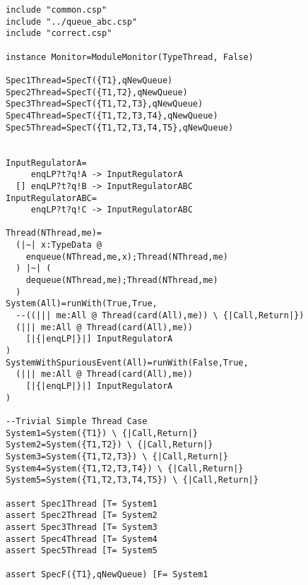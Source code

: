 \begin{lstlisting}
include "common.csp"
include "../queue_abc.csp"
include "correct.csp"

instance Monitor=ModuleMonitor(TypeThread, False)

Spec1Thread=SpecT({T1},qNewQueue)
Spec2Thread=SpecT({T1,T2},qNewQueue)
Spec3Thread=SpecT({T1,T2,T3},qNewQueue)
Spec4Thread=SpecT({T1,T2,T3,T4},qNewQueue)
Spec5Thread=SpecT({T1,T2,T3,T4,T5},qNewQueue)


InputRegulatorA=
     enqLP?t?q!A -> InputRegulatorA
  [] enqLP?t?q!B -> InputRegulatorABC 
InputRegulatorABC=
     enqLP?t?q!C -> InputRegulatorABC

Thread(NThread,me)=
  (|~| x:TypeData @ 
    enqueue(NThread,me,x);Thread(NThread,me)
  ) |~| (
    dequeue(NThread,me);Thread(NThread,me)
  )
System(All)=runWith(True,True,
  --((||| me:All @ Thread(card(All),me)) \ {|Call,Return|})
  (||| me:All @ Thread(card(All),me))
    [|{|enqLP|}|] InputRegulatorA
)
SystemWithSpuriousEvent(All)=runWith(False,True,
  (||| me:All @ Thread(card(All),me)) 
    [|{|enqLP|}|] InputRegulatorA
)

--Trivial Simple Thread Case
System1=System({T1}) \ {|Call,Return|}
System2=System({T1,T2}) \ {|Call,Return|}
System3=System({T1,T2,T3}) \ {|Call,Return|}
System4=System({T1,T2,T3,T4}) \ {|Call,Return|}
System5=System({T1,T2,T3,T4,T5}) \ {|Call,Return|}

assert Spec1Thread [T= System1
assert Spec2Thread [T= System2
assert Spec3Thread [T= System3
assert Spec4Thread [T= System4
assert Spec5Thread [T= System5

assert SpecF({T1},qNewQueue) [F= System1
\end{lstlisting}
